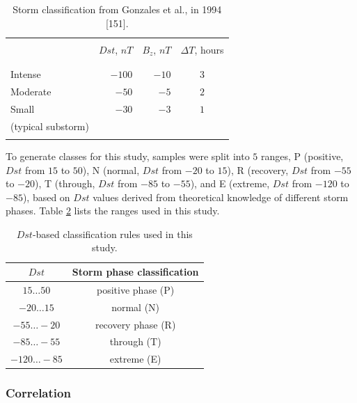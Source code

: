 \documentclass[sn-mathphys-num]{sn-jnl}%
\begin{document}
\begin{table}[!ht]
    \centering
    \caption{Storm classification from Gonzales et al., in 1994 [151].}
    \label{tab:gonzalez1994}
    \begin{tabular}{lrrc}
        \hline
        \\
         & $Dst$, $nT$ & $B_{z}$, $nT$ & $\Delta T$, hours \\
        \\
        \hline
        \\
        Intense & $-100$ & $-10$ & $3$ \\
        Moderate & $-50$ & $-5$ & $2$ \\
        Small & $-30$ & $-3$ & $1$ \\
        (typical substorm) & & & \\
        \\
        \hline
    \end{tabular}
\end{table}

To generate classes for this study, samples were split into $5$ ranges, P (positive, $Dst$ from $15$ to $50$), N (normal, $Dst$ from $-20$ to $15$), R (recovery, $Dst$ from $-55$ to $-20$), T (through, $Dst$ from $-85$ to $-55$), and E (extreme, $Dst$ from $-120$ to $-85$), based on $Dst$ values derived from theoretical knowledge of different storm phases. Table \ref{tab:Dstranges} lists the ranges used in this study.

\begin{table}[!ht]
    \centering
    \caption{$Dst$-based classification rules used in this study.}
    \label{tab:Dstranges}
    \begin{tabular}{|c|c|}
        \hline
        $Dst$ & Storm phase classification \\ \hline
        $15\dots50$ & positive phase (P) \\ \hline
        $-20\dots15$ & normal (N) \\ \hline
        $-55\dots-20$ & recovery phase (R) \\ \hline
        $-85\dots-55$ & through (T) \\ \hline
        $-120\dots-85$ & extreme (E) \\ \hline
    \end{tabular}
\end{table}

\subsubsection{Correlation}
\end{document}
